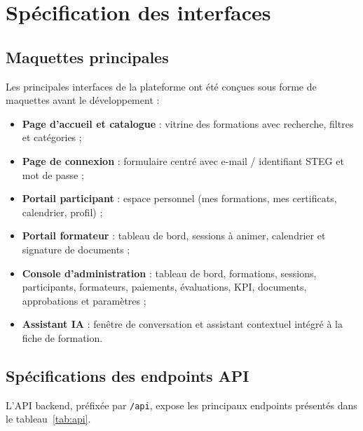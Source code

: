 \documentclass[12pt,a4paper]{report}
\begin{document}
\section{Spécification des interfaces}

\subsection{Maquettes principales}

Les principales interfaces de la plateforme ont été conçues sous forme de maquettes avant le développement :
\begin{itemize}
    \item \textbf{Page d'accueil et catalogue} : vitrine des formations avec recherche, filtres et catégories ;
    \item \textbf{Page de connexion} : formulaire centré avec e-mail / identifiant STEG et mot de passe ;
    \item \textbf{Portail participant} : espace personnel (mes formations, mes certificats, calendrier, profil) ;
    \item \textbf{Portail formateur} : tableau de bord, sessions à animer, calendrier et signature de documents ;
    \item \textbf{Console d'administration} : tableau de bord, formations, sessions, participants, formateurs, paiements, évaluations, KPI, documents, approbations et paramètres ;
    \item \textbf{Assistant IA} : fenêtre de conversation et assistant contextuel intégré à la fiche de formation.
\end{itemize}

\subsection{Spécifications des endpoints API}

L'API backend, préfixée par \texttt{/api}, expose les principaux endpoints présentés dans le tableau~\ref{tab:api}.
\end{document}
